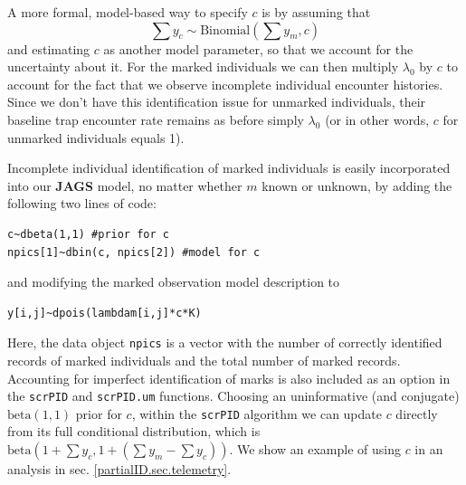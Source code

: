 A more formal, model-based way to specify $c$ is by assuming that
\[
\sum y_c \sim \mbox{Binomial}(\sum y_m, c)
\]
and estimating $c$ as another model parameter, so that we account for the uncertainty about it.
For the marked individuals we can then multiply $\lambda_0$
by $c$ to account for the fact that we observe incomplete individual
encounter histories. Since we don't have this identification issue for
unmarked individuals, their baseline trap encounter rate remains as
before simply $\lambda_0$ (or in other words, $c$ for unmarked individuals equals 1).

Incomplete individual identification of marked
individuals is easily incorporated into our {\bf JAGS} model, no matter whether $m$ known or unknown, by adding the following two lines of code:
{\small
\begin{verbatim}
c~dbeta(1,1) #prior for c
npics[1]~dbin(c, npics[2]) #model for c
\end{verbatim}
}
and modifying the marked observation model description to
{\small
\begin{verbatim}
y[i,j]~dpois(lambdam[i,j]*c*K)
\end{verbatim}
}
Here, the data object {\tt npics} is a vector with the number of correctly identified records of marked individuals and the total number of marked records. Accounting for imperfect identification of marks is also included as an option in the {\tt scrPID} and  {\tt scrPID.um} functions. Choosing an uninformative (and conjugate) $\mbox{beta}(1,1)$ prior for $c$, within the {\tt scrPID} algorithm we can update $c$ directly from its full conditional distribution, which is $\mbox{beta}(1 + \sum y_c, 1 + (\sum y_m-\sum y_c))$.
We show an example of using $c$ in an analysis in
sec. \ref{partialID.sec.telemetry}.

